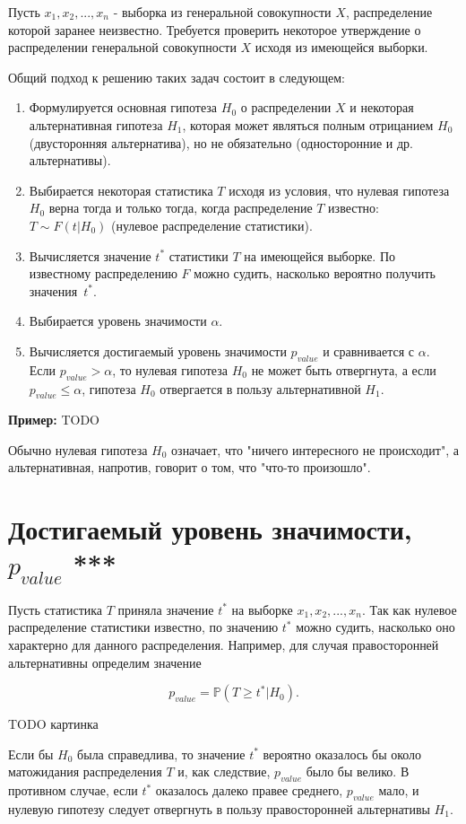 Пусть $x_1, x_2, ..., x_n$ - выборка из генеральной совокупности $X$, распределение которой заранее неизвестно.
Требуется проверить некоторое утверждение о распределении генеральной совокупности $X$ исходя из имеющейся выборки.

Общий подход к решению таких задач состоит в следующем:
\begin{enumerate}
    \item Формулируется основная гипотеза $H_0$ о распределении $X$ и некоторая альтернативная гипотеза $H_1$, которая может являться полным отрицанием $H_0$ (двусторонняя альтернатива), но не обязательно (односторонние и др. альтернативы).
    \item Выбирается некоторая статистика $T$ исходя из условия, что нулевая гипотеза $H_0$ верна тогда и только тогда, когда распределение $T$ известно: $T \sim F(t|H_0)$ (нулевое распределение статистики). 
    \item Вычисляется значение $t^*$ статистики $T$ на имеющейся выборке. По известному распределению $F$ можно судить, насколько вероятно получить значения~$t^*$.
    \item Выбирается уровень значимости $\alpha$.
    \item Вычисляется достигаемый уровень значимости $p_{value}$ и сравнивается с $\alpha$. Если $p_{value} > \alpha$, то нулевая гипотеза $H_0$ не может быть отвергнута, а если $p_{value} \leqslant \alpha$, гипотеза $H_0$ отвергается в пользу альтернативной $H_1$.
\end{enumerate}

\textbf{Пример:} TODO

Обычно нулевая гипотеза $H_0$ означает, что "ничего интересного не происходит", а альтернативная, напротив, говорит о том, что "что-то произошло".

\section{Достигаемый уровень значимости, $p_{value}$ ***}

Пусть статистика $T$ приняла значение $t^*$ на выборке $x_1, x_2, ..., x_n$. Так как нулевое распределение статистики известно, по значению $t^*$ можно судить, насколько оно характерно для данного распределения. Например, для случая правосторонней альтернативны определим значение

$$
p_{value} = \mathbb{P}(T \geqslant t^* | H_0).
$$

TODO картинка

Если бы $H_0$ была справедлива, то значение $t^*$ вероятно оказалось бы около матожидания распределения $T$ и, как следствие, $p_{value}$ было бы велико. В противном случае, если $t^*$ оказалось далеко правее среднего, $p_{value}$ мало, и нулевую гипотезу следует отвергнуть в пользу правосторонней альтернативы $H_1$.

